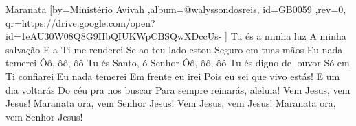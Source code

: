 \beginsong
{Maranata %
}[by={Ministério Avivah %
},album={@walyssondosreis},
id={GB0059 %
},rev={0}, %
qr={https://drive.google.com/open?id=1eAU30W08Q8G9HbQIUKWpCBSQwXDccUs- %
}]
\beginverse*
Tu és a minha luz
A minha salvação
E a Ti me renderei
Se ao teu lado estou
Seguro em tuas mãos
Eu nada temerei
\endverse
\beginverse*
Ôô, ôô, ôô
Tu és Santo, ó Senhor
Ôô, ôô, ôô
Tu és digno de louvor
\endverse
\beginchorus
Só em Ti confiarei
Eu nada temerei
Em frente eu irei
Pois eu sei que vivo estás!
E um dia voltarás
Do céu pra nos buscar
Para sempre reinarás, aleluia!
\endchorus
\beginverse*
Vem Jesus, vem Jesus!
Maranata ora, vem Senhor Jesus!
Vem Jesus, vem Jesus!
Maranata ora, vem Senhor Jesus!
\endverse
\vspace{4em} %
\begin{comment}
\lstset{basicstyle=\scriptsize\bf} %
\tab{Solo 1}
\begin{lstlisting}
E|-----------------------------------------------------|
B|-----------------------------------------------------|
G|-----------------------------------------------------|
D|-----------------------------------------------------|
A|-----------------------------------------------------|
E|-----------------------------------------------------|
\end{lstlisting}
\end{comment}
 
